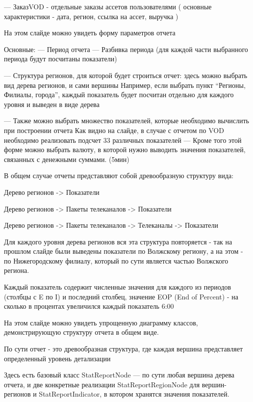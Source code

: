\documentclass[a4paper]{article}
\begin{document}
--- ЗаказVOD - отдельные заказы ассетов пользователями ( основные характеристики - дата, регион, ссылка на ассет, выручка )

\newpage
На этом слайде можно увидеть форму параметров отчета

Основные:
--- Период отчета
--- Разбивка периода (для каждой части выбранного периода будут посчитаны показатели)

\newpage
--- Структура регионов, для которой будет строиться отчет: здесь можно выбрать вид дерева регионов, и сами вершины
Например, если выбрать пункт “Регионы, Филиалы, города”, каждый показатель будет посчитан отдельно для каждого уровня и выведен в виде дерева


\newpage
--- Также можно выбрать множество показателей, которые необходимо вычислить при построении отчета
Как видно на слайде, в случае с отчетом по VOD необходимо реализовать подсчет 33 различных показателей
--- Кроме того этой форме можно выбрать валюту, в которой нужно выводить значения показателей, связанных с денежными суммами.
(5мин)

\newpage
В общем случае отчеты представляют собой древообразную структуру вида:

  Дерево регионов -> Показатели

  Дерево регионов -> Пакеты телеканалов -> Показатели

  Дерево регионов -> Пакеты телеканалов -> Телеканалы -> Показатели


\newpage

Для каждого уровня дерева регионов вся эта структура повторяется - так на прошлом слайде были выведены показатели по Волжскому региону, а на этом - по Нижегородскому филиалу, который по сути является частью Волжского региона.

Каждый показатель содержит численные значения для каждого из периодов (столбцы с E по I) и последний столбец, значение EOP (End of Percent) - на сколько в процентах увеличился каждый показатель
6:00


\newpage

На этом слайде можно увидеть упрощенную диаграмму классов, демонстрирующую структуру отчета в общем виде.

По сути отчет - это древообразная структура, где каждая вершина представляет определенный уровень детализации

Здесь есть базовый класс StatReportNode --- по сути любая вершина дерева отчета,
и две конкретные реализации StatReportRegionNode для вершин-регионов и StatReportIndicator, в котором хранятся значения показателей.
\end{document}
